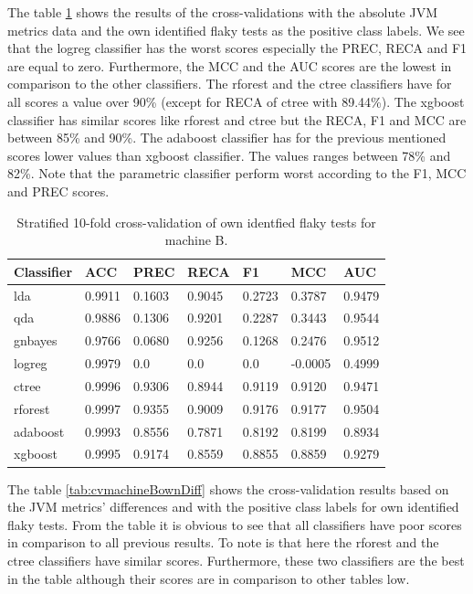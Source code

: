 \documentclass{seal_thesis}
\begin{document}
\noindent The table \ref{tab:cvmachineBown} shows the results of the cross-validations with the absolute JVM metrics data and the own identified flaky tests as the positive class labels. We see that the logreg classifier has the worst scores especially the PREC, RECA and F1 are equal to zero. Furthermore, the MCC and the AUC scores are the lowest in comparison to the other classifiers. The rforest and the ctree classifiers have for all scores a value over 90\% (except for RECA of ctree with 89.44\%). The xgboost classifier has similar scores like rforest and ctree but the RECA, F1 and MCC are between 85\% and 90\%. The adaboost classifier has for the previous mentioned scores lower values than xgboost classifier. The values ranges between 78\% and 82\%. Note that the parametric classifier perform worst according to the F1, MCC and PREC scores. \\



\begin{table}[ht]
\centering
\begin{tabular}{|l|l|l|l|l|l|l|}
\hline
\textbf{Classifier} & \textbf{ACC} & \textbf{PREC} & \textbf{RECA} & \textbf{F1} & \textbf{MCC} & \textbf{AUC} \\ \hline
lda & 0.9911 & 0.1603 & 0.9045 & 0.2723 & 0.3787 & 0.9479 \\ \hline
qda & 0.9886 & 0.1306 & 0.9201 & 0.2287 & 0.3443 & 0.9544 \\ \hline
gnbayes & 0.9766 & 0.0680 & 0.9256 & 0.1268 & 0.2476 & 0.9512 \\ \hline
logreg & 0.9979 & 0.0 & 0.0 & 0.0 & -0.0005 & 0.4999 \\ \hline
ctree & 0.9996 & 0.9306 & 0.8944 & 0.9119 & 0.9120 & 0.9471 \\ \hline
rforest & 0.9997 & 0.9355 & 0.9009 & 0.9176 & 0.9177 & 0.9504 \\ \hline
adaboost & 0.9993 & 0.8556 & 0.7871 & 0.8192 & 0.8199 & 0.8934 \\ \hline
xgboost & 0.9995 & 0.9174 & 0.8559 & 0.8855 & 0.8859 & 0.9279 \\ \hline
\end{tabular}
\caption{Stratified 10-fold cross-validation of own identfied flaky tests for machine B.}
\label{tab:cvmachineBown}
\end{table}


\noindent The table \ref{tab:cvmachineBownDiff} shows the cross-validation results based on the JVM metrics' differences and with the positive class labels for own identified flaky tests. From the table it is obvious to see that all classifiers have poor scores in comparison to all previous results. To note is that here the rforest and the ctree classifiers have similar scores. Furthermore, these two classifiers are the best in the table although their scores are in comparison to other tables low. \\
\end{document}
